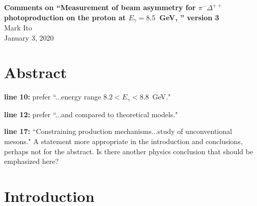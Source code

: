 \documentclass{article}
\newcommand{\itm}[1]{\item{\bf line #1:}}
\begin{document}
\begin{center}
{\Large\bf Comments on ``Measurement of beam asymmetry for $\pi^-\Delta^{++}$ photoproduction on the proton at $E_\gamma = 8.5$~GeV, '' version 3} \\
Mark Ito \\
January 3, 2020
\end{center}

\section{Abstract}

\begin{description}
\itm{10} prefer ``...energy range $8.2 < E_\gamma < 8.8$~GeV."
\itm{12} prefer ``...and compared to theoretical  models."
\itm{17} ``Constraining production mechanisms...study of unconventional mesons." A statement more appropriate in the introduction and conclusions, perhaps not for the abstract. Is there another physics conclusion that should be emphasized here?
\end{description}

\section{Introduction}
\end{document}
